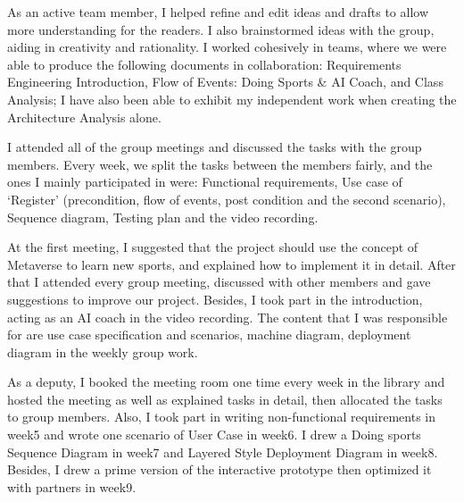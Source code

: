 \documentclass[a4paper]{article}
\begin{document}
	\par
	As an active team member, I helped refine and edit ideas and drafts to allow more understanding for the readers. I also brainstormed ideas with the group, aiding in creativity and rationality.  I worked cohesively in teams, where we were able to produce the following documents in collaboration: Requirements Engineering Introduction, Flow of Events: Doing Sports \& AI Coach, and Class Analysis; I have also been able to exhibit my independent work when creating the Architecture Analysis alone.\\

	\par
	I attended all of the group meetings and discussed the tasks with the group members. Every week, we split the tasks between the members fairly, and the ones I mainly participated in were: Functional requirements, Use case of `Register' (precondition, flow of events, post condition and the second scenario), Sequence diagram, Testing plan and the video recording.\\

	\par
	At the first meeting, I suggested that the project should use the concept of Metaverse to learn new sports, and explained how to implement it in detail. After that I attended every group meeting, discussed with other members and gave suggestions to improve our project. Besides, I took part in the introduction, acting as an AI coach in the video recording. The content that I was responsible for are use case specification and scenarios, machine diagram, deployment diagram in the weekly group work.\\
	
	\par
	As a deputy, I booked the meeting room one time every week in the library and hosted the meeting as well as explained tasks in detail, then allocated the tasks to group members. Also, I took part in writing non-functional requirements in week5 and wrote one scenario of User Case in week6. I drew a Doing sports Sequence Diagram in week7 and Layered Style Deployment Diagram in week8. Besides, I drew a prime version of the interactive prototype then optimized it with partners in week9.\\
\end{document}
